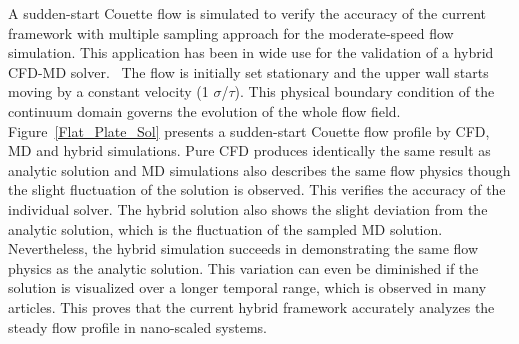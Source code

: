 \documentclass[preprint,12pt]{elsarticle}
\begin{document}
A sudden-start Couette flow is simulated to verify the accuracy of the current framework with multiple sampling approach for the moderate-speed flow simulation. This application has been in wide use for the validation of a hybrid CFD-MD solver.~\cite{Nie,Yen} The flow is initially set stationary and the upper wall starts moving by a constant velocity (1 $\sigma$/$\tau$). This physical boundary condition of the continuum domain governs the evolution of the whole flow field. Figure~\ref{Flat_Plate_Sol} presents a sudden-start Couette flow profile by CFD, MD and hybrid simulations.
Pure CFD produces identically the same result as analytic solution and MD simulations also describes the same flow physics though the slight fluctuation of the solution is observed. This verifies the accuracy of the individual solver. The hybrid solution also shows the slight deviation from the analytic solution, which is the fluctuation of the sampled MD solution. Nevertheless, the hybrid simulation succeeds in demonstrating the same flow physics as the analytic solution. This variation can even be diminished if the solution is visualized over a longer temporal range, which is observed in many articles.
This proves that the current hybrid framework accurately analyzes the steady flow profile in nano-scaled systems.
\end{document}
